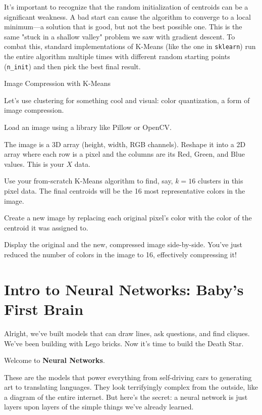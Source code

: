 \documentclass[11pt, letterpaper, openany]{book}
\begin{document}
It's important to recognize that the random initialization of centroids can be a significant weakness. A bad start can cause the algorithm to converge to a local minimum—a solution that is good, but not the best possible one. This is the same "stuck in a shallow valley" problem we saw with gradient descent. To combat this, standard implementations of K-Means (like the one in \texttt{sklearn}) run the entire algorithm multiple times with different random starting points (\texttt{n\_init}) and then pick the best final result.

\begin{challengebox}
Image Compression with K-Means

Let's use clustering for something cool and visual: color quantization, a form of image compression.

Load an image using a library like Pillow or OpenCV.

The image is a 3D array (height, width, RGB channels). Reshape it into a 2D array where each row is a pixel and the columns are its Red, Green, and Blue values. This is your $X$ data.

Use your from-scratch K-Means algorithm to find, say, $k=16$ clusters in this pixel data. The final centroids will be the 16 most representative colors in the image.

Create a new image by replacing each original pixel's color with the color of the centroid it was assigned to.

Display the original and the new, compressed image side-by-side. You've just reduced the number of colors in the image to 16, effectively compressing it!
\end{challengebox}

\chapter{Intro to Neural Networks: Baby’s First Brain}

Alright, we've built models that can draw lines, ask questions, and find cliques. We've been building with Lego bricks. Now it's time to build the Death Star.

Welcome to \textbf{Neural Networks}.

These are the models that power everything from self-driving cars to generating art to translating languages. They look terrifyingly complex from the outside, like a diagram of the entire internet. But here's the secret: a neural network is just layers upon layers of the simple things we've already learned.
\end{document}
